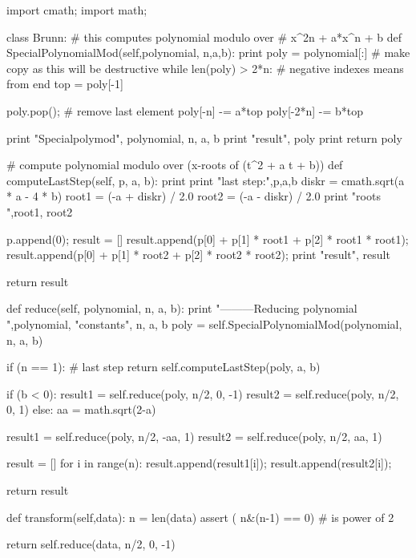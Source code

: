 \begin{python}
import cmath;
import math;

class Brunn:
    # this computes polynomial modulo over
    #  x^2n + a*x^n + b
    def SpecialPolynomialMod(self,polynomial, n,a,b):
        print
        poly = polynomial[:] # make copy as this will be destructive
        while len(poly) > 2*n:
            # negative indexes means from end
            top = poly[-1]

            poly.pop(); # remove last element
            poly[-n] -= a*top
            poly[-2*n] -= b*top

        print "Specialpolymod", polynomial, n, a, b
        print "result", poly
        print
        return poly

    # compute polynomial modulo over (x-roots of (t^2 + a t + b))
    def computeLastStep(self, p, a, b):
        print
        print "last step:",p,a,b
        diskr = cmath.sqrt(a * a - 4 * b)
        root1 = (-a + diskr) / 2.0
        root2 = (-a - diskr) / 2.0
        print "roots ",root1, root2

        p.append(0);
        result = []
        result.append(p[0] + p[1] * root1 + p[2] * root1 * root1);
        result.append(p[0] + p[1] * root2 + p[2] * root2 * root2);
        print "result", result

        return result
        

    def reduce(self, polynomial, n, a, b):        
        print "---------Reducing polynomial ",polynomial, "constants", n, a, b
        poly = self.SpecialPolynomialMod(polynomial, n, a, b)

        if (n == 1): # last step
            return self.computeLastStep(poly, a, b) 
            

        if (b < 0):
            result1 = self.reduce(poly, n/2, 0, -1)
            result2 = self.reduce(poly, n/2, 0, 1)    
        else:
            aa = math.sqrt(2-a)

            result1  = self.reduce(poly, n/2, -aa, 1)
            result2  = self.reduce(poly, n/2, aa, 1)    

        result = []
        for i in range(n):
            result.append(result1[i]);
            result.append(result2[i]);

        return result


    def transform(self,data):
        n = len(data)
        assert ( n&(n-1) == 0) # is power of 2

        return self.reduce(data, n/2, 0, -1)
\end{python}
